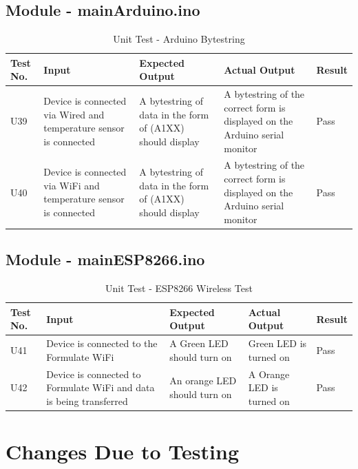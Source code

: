 \documentclass[12pt, titlepage]{article}
\begin{document}
\subsection{Module - mainArduino.ino}\begin{table}[H]
  \begin{tabular}{| p{} | p{}| p{}| p{}| p{}|}
    \hline
    \rowcolor[gray]{0.9}
    Test No. & Input & Expected Output & Actual Output & Result\\
    \hline
    U39 & Device is connected via Wired and temperature sensor is connected & A bytestring of data in the form of (A1XX) should display & A bytestring of the correct form is displayed on the Arduino serial monitor & Pass \\
    \hline
    U40 & Device is connected via WiFi and temperature sensor is connected & A bytestring of data in the form of (A1XX) should display & A bytestring of the correct form is displayed on the Arduino serial monitor & Pass \\
    \hline
  \end{tabular}
  \caption{Unit Test - Arduino Bytestring}
\end{table}

\subsection{Module - mainESP8266.ino}\begin{table}[H]
  \begin{tabular}{| p{} | p{}| p{}| p{}| p{}|}
    \hline
    \rowcolor[gray]{0.9}
    Test No. & Input & Expected Output & Actual Output & Result\\
    \hline
    U41 & Device is connected to the Formulate WiFi & A Green LED should turn on & Green LED is turned on & Pass \\
    \hline
    U42 & Device is connected to Formulate WiFi and data is being transferred & An orange LED should turn on & A Orange LED is turned on & Pass \\
    \hline
  \end{tabular}
  \caption{Unit Test - ESP8266 Wireless Test}
\end{table}

  

\newpage
\section{Changes Due to Testing}
\end{document}
